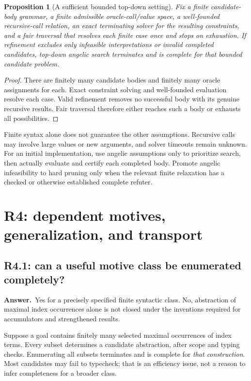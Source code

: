 \documentclass[11pt,a4paper]{article}
\newtheorem{proposition}{Proposition}[section]
\theoremstyle{definition}
\theoremstyle{remark}
\newcommand{\ans}{\noindent\textbf{Answer.}\ }
\begin{document}
\begin{proposition}[A sufficient bounded top-down setting]
Fix a finite candidate-body grammar, a finite admissible oracle-call/value
space, a well-founded recursive-call relation, an exact terminating solver for
the resulting constraints, and a fair traversal that resolves each finite case
once and stops on exhaustion. If refinement excludes only
infeasible interpretations or invalid completed candidates, top-down angelic
search terminates and is complete for that bounded candidate problem.
\end{proposition}
\begin{proof}
There are finitely many candidate bodies and finitely many oracle assignments
for each. Exact constraint solving and well-founded evaluation resolve each
case. Valid refinement removes no successful body with its genuine recursive
results. Fair traversal therefore either reaches such a body or exhausts all
possibilities.
\end{proof}

Finite syntax alone does not guarantee the other assumptions. Recursive calls
may involve large values or new arguments, and solver timeouts remain unknown.
For an initial implementation, use angelic assumptions only to prioritize
search, then actually evaluate and certify each completed body. Promote angelic
infeasibility to hard pruning only when the relevant finite relaxation has a
checked or otherwise established complete refuter.

\section{R4: dependent motives, generalization, and transport}\label{sec:r4}

\subsection{R4.1: can a useful motive class be enumerated completely?}\label{q:R4.1}
\ans Yes for a precisely specified finite syntactic class. No, abstraction of
maximal index occurrences alone is not closed under the inventions required
for accumulators and strengthened results.

Suppose a goal contains finitely many selected maximal occurrences of index
terms. Every subset determines a candidate abstraction, after scope and typing
checks. Enumerating all subsets terminates and is complete for \emph{that
construction}. Most candidates may fail to typecheck; that is an efficiency
issue, not a reason to infer completeness for a broader class.
\end{document}
